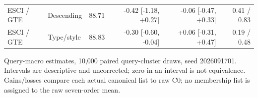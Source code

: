 \begin{table}[t]
\begin{tabular}{llrrrr}
ESCI / GTE & Descending & 88.71 & -0.42 [-1.18, +0.27] & -0.06 [-0.47, +0.33] & 0.41 / 0.83 \\
ESCI / GTE & Type/style & 88.83 & -0.30 [-0.60, -0.04] & +0.06 [-0.31, +0.47] & 0.19 / 0.48 \\
\bottomrule
\end{tabular}
\par\smallskip\begin{minipage}{\linewidth}\small Query-macro estimates, 10,000 paired query-cluster draws, seed 2026091701. Intervals are descriptive and uncorrected; zero in an interval is not equivalence. Gains/losses compare each actual canonical list to raw C0; no membership list is assigned to the raw seven-order mean.\end{minipage}
\end{table}

